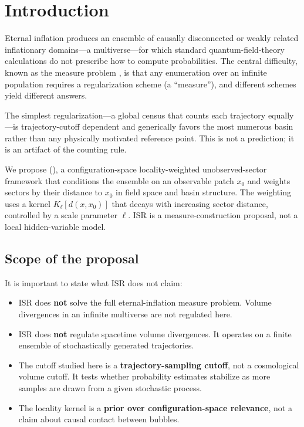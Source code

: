 \section{Introduction}
\label{sec:introduction}

Eternal inflation \cite{guth_eternal} produces an ensemble of causally disconnected
or weakly related inflationary domains---a multiverse---for which standard
quantum-field-theory calculations do not prescribe how to compute probabilities.
The central difficulty, known as the measure problem
\cite{freivogel_measure}, is that any enumeration over an infinite population
requires a regularization scheme (a ``measure''), and different schemes yield
different answers.

The simplest regularization---a global census that counts each trajectory
equally---is trajectory-cutoff dependent and generically favors the most
numerous basin rather than any physically motivated reference point.
This is not a prediction; it is an artifact of the counting rule.

We propose \isr (\ISR), a configuration-space locality-weighted unobserved-sector
framework that conditions the ensemble on an observable patch $x_0$ and
weights sectors by their distance to $x_0$ in field space and basin structure.
The weighting uses a kernel $K_\ell[d(x, x_0)]$ that decays with increasing
sector distance, controlled by a scale parameter $\ell$.
ISR is a measure-construction proposal, not a local hidden-variable model.

\subsection{Scope of the proposal}
\label{sec:scope}

It is important to state what ISR does not claim:

\begin{itemize}
  \item ISR does \textbf{not} solve the full eternal-inflation measure problem.
        Volume divergences in an infinite multiverse are not regulated here.
  \item ISR does \textbf{not} regulate spacetime volume divergences.
        It operates on a finite ensemble of stochastically generated trajectories.
  \item The cutoff studied here is a \textbf{trajectory-sampling cutoff},
        not a cosmological volume cutoff.
        It tests whether probability estimates stabilize as more samples are
        drawn from a given stochastic process.
  \item The locality kernel is a \textbf{prior over configuration-space relevance},
        not a claim about causal contact between bubbles.
\end{itemize}

